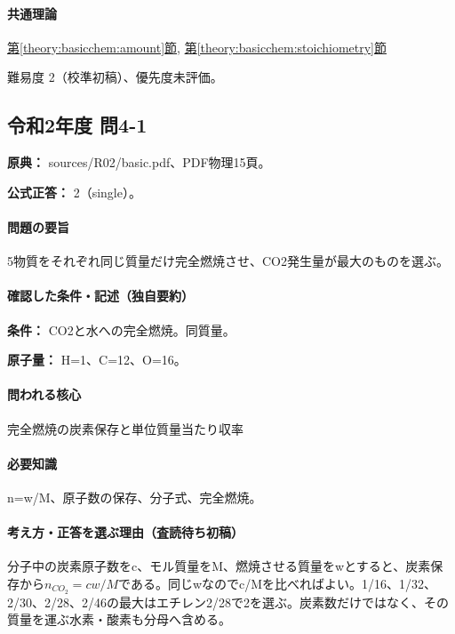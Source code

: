 \paragraph{共通理論} \hyperref[theory:basicchem:amount]{第\ref*{theory:basicchem:amount}節}, \hyperref[theory:basicchem:stoichiometry]{第\ref*{theory:basicchem:stoichiometry}節}

\par 難易度 2（校準初稿）、優先度未評価。

\subsection{令和2年度 問4-1}
\label{q:r02-reg-basic-4-1}

\noindent\textbf{原典：} sources/R02/basic.pdf、PDF物理15頁。

\textbf{公式正答：} 2（single）。

\paragraph{問題の要旨} 5物質をそれぞれ同じ質量だけ完全燃焼させ、CO2発生量が最大のものを選ぶ。

\paragraph{確認した条件・記述（独自要約）}\mbox{}\par

\noindent\textbf{条件：} CO2と水への完全燃焼。同質量。\par

\noindent\textbf{原子量：} H=\allowbreak{}1、C=\allowbreak{}12、O=\allowbreak{}16。\par

\paragraph{問われる核心} 完全燃焼の炭素保存と単位質量当たり収率

\paragraph{必要知識} n=\allowbreak{}w/M、原子数の保存、分子式、完全燃焼。

\paragraph{考え方・正答を選ぶ理由（査読待ち初稿）} 分子中の炭素原子数をc、モル質量をM、燃焼させる質量をwとすると、炭素保存から\(n_{CO_2}=c w/M\)である。同じwなのでc/Mを比べればよい。1/16、1/32、2/30、2/28、2/46の最大はエチレン2/28で2を選ぶ。炭素数だけではなく、その質量を運ぶ水素・酸素も分母へ含める。

